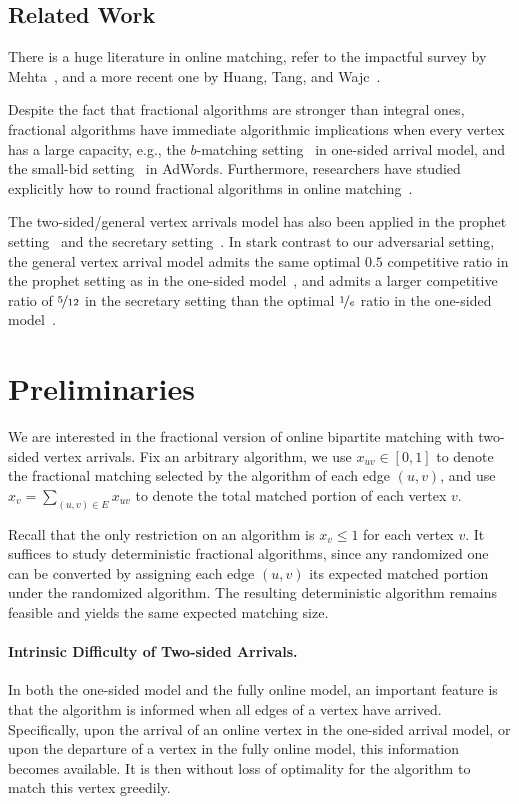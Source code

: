 \documentclass[11pt,letterpaper]{article}
\begin{document}
 
\subsection{Related Work}
There is a huge literature in online matching, refer to the impactful survey by Mehta~\cite{fttcs/Mehta13}, and a more recent one by Huang, Tang, and Wajc~\cite{ec/HuangTW24}.

Despite the fact that fractional algorithms are stronger than integral ones, fractional algorithms have immediate algorithmic implications when every vertex has a large capacity, e.g., the $b$-matching setting~\cite{tcs/KalyanasundaramP00} in one-sided arrival model, and the small-bid setting~\cite{jacm/MehtaSVV07} in AdWords. Furthermore, researchers have studied explicitly how to round fractional algorithms in online matching~\cite{soda/CohenW18,soda/BuchbinderNW23,stoc/TangWW22}.

The two-sided/general vertex arrivals model has also been applied in the prophet setting~\cite{mor/EzraFGT22} and the secretary setting~\cite{ec/EzraFGT22}. In stark contrast to our adversarial setting, the general vertex arrival model admits the same optimal $0.5$ competitive ratio in the prophet setting as in the one-sided model~\cite{soda/FeldmanGL15}, and admits a larger competitive ratio of $\nicefrac{5}{12}$ in the secretary setting than the optimal $\nicefrac{1}{e}$ ratio in the one-sided model~\cite{esa/KesselheimRTV13}. 

%
 
\section{Preliminaries}
\label{sec:prelim}
We are interested in the fractional version of online bipartite matching with two-sided vertex arrivals.
Fix an arbitrary algorithm, we use $x_{uv} \in [0,1]$ to denote the fractional matching selected by the algorithm of each edge $(u,v)$, and use $x_v = \sum_{(u,v)\in E} x_{uv}$ to denote the total matched portion of each vertex $v$.

Recall that the only restriction on an algorithm is $x_v \le 1$ for each vertex $v$. It suffices to study deterministic fractional algorithms, since any randomized one can be converted by assigning each edge $(u,v)$ its expected matched portion under the randomized algorithm. The resulting deterministic algorithm remains feasible and yields the same expected matching size.
\paragraph{Intrinsic Difficulty of Two-sided Arrivals.}
In both the one-sided model and the fully online model, an important feature is that the algorithm is informed when all edges of a vertex have arrived. Specifically, upon the arrival of an online vertex in the one-sided arrival model, or upon the departure of a vertex in the fully online model, this information becomes available. It is then without loss of optimality for the algorithm to match this vertex greedily.
\end{document}
